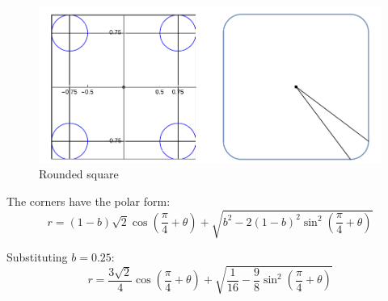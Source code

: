 \documentclass[12pt]{article}
\begin{document}
        \begin{figure}[H]
            \centering
            \includegraphics[width=0.9\linewidth]{images/rounded_square.png}
            \caption{Rounded square\cite{bridge_wolfram}}
            \label{fig:rounded_square}
        \end{figure}


        The corners have the polar form:
        \begin{equation}
            r = (1-b)\sqrt{2} \cos (\frac{\pi}{4} + \theta) + \sqrt{b^2 - 2(1-b)^2 \sin^2 (\frac{\pi}{4}+\theta)}
        \end{equation}

        Substituting $b=0.25$:
        \begin{equation}
            r = \frac{3\sqrt{2}}{4} \cos (\frac{\pi}{4} + \theta) + \sqrt{\frac{1}{16} - \frac{9}{8} \sin^2 (\frac{\pi}{4}+\theta)}
        \end{equation}

    \newpage
    
    

    
    
    
        
\end{document}

